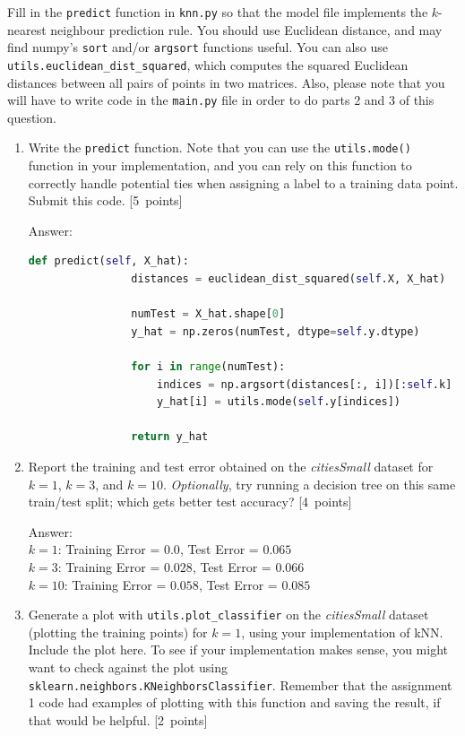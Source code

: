 \documentclass{article}
\newcommand{\blu}[1]{{\textcolor{blu}{#1}}}
\newenvironment{answer}{\par\begingroup\color{gre}Answer: }{\endgroup}
\let\ask\blu
\newcommand\pts[1]{\textcolor{pointscolour}{[#1~points]}}
\begin{document}
    Fill in the \texttt{predict} function in \texttt{knn.py} so that the model file implements the $k$-nearest neighbour prediction rule.
    You should use Euclidean distance, and may find numpy's \texttt{sort} and/or \texttt{argsort} functions useful.
    You can also use \texttt{utils.euclidean\string_dist\string_squared}, which computes the squared Euclidean distances between all pairs of points in two matrices. Also, please note that you will have to write code in the \texttt{main.py} file in order to do parts 2 and 3 of this question.
    \begin{enumerate}
        \item Write the \texttt{predict} function. Note that you can use the \texttt{utils.mode()} function in your implementation, and you can rely on this function to correctly handle potential ties when assigning a label to a training data point. \ask{Submit this code.} \pts{5}
        \begin{answer}
            \begin{lstlisting}[language=Python]
                def predict(self, X_hat):
                distances = euclidean_dist_squared(self.X, X_hat) 

                numTest = X_hat.shape[0]
                y_hat = np.zeros(numTest, dtype=self.y.dtype)

                for i in range(numTest):
                    indices = np.argsort(distances[:, i])[:self.k]
                    y_hat[i] = utils.mode(self.y[indices])
                
                return y_hat
            \end{lstlisting}
        \end{answer}
        \item \ask{Report the training and test error} obtained on the \emph{citiesSmall} dataset for $k=1$, $k=3$, and $k=10$. \emph{Optionally}, try running a decision tree on this same train/test split; which gets better test accuracy? \pts{4}
        \begin{answer} \\
            $k=1$: Training Error = $0.0$, Test Error = $0.065$ \\
            $k=3$: Training Error = $0.028$, Test Error = $0.066$ \\
            $k=10$: Training Error = $0.058$, Test Error = $0.085$
        \end{answer}
        \item Generate a plot with \texttt{utils.plot\_classifier} on the \emph{citiesSmall} dataset (plotting the training points) for $k=1$, using your implementation of kNN. \ask{Include the plot here.} To see if your implementation makes sense, you might want to check against the plot using \texttt{sklearn.neighbors.KNeighborsClassifier}. Remember that the assignment 1 code had examples of plotting with this function and saving the result, if that would be helpful. \pts{2}
        

\end{enumerate}
\end{document}
